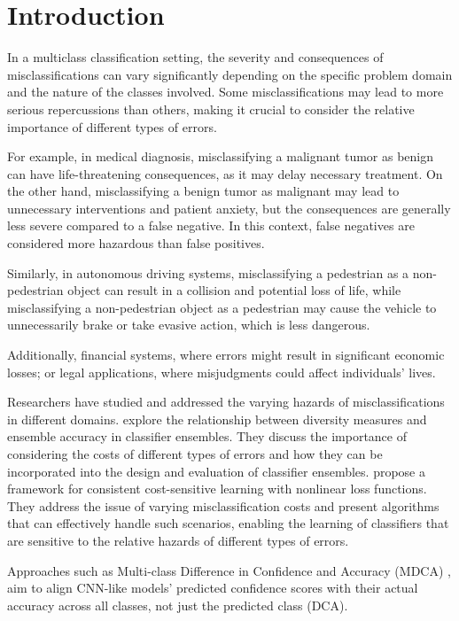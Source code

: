 
\section{Introduction}

In a multiclass classification setting, the severity and consequences of misclassifications can vary significantly depending on the specific problem domain and the nature of the classes involved. Some misclassifications may lead to more serious repercussions than others, making it crucial to consider the relative importance of different types of errors.

For example, in medical diagnosis, misclassifying a malignant tumor as benign can have life-threatening consequences, as it may delay necessary treatment. On the other hand, misclassifying a benign tumor as malignant may lead to unnecessary interventions and patient anxiety, but the consequences are generally less severe compared to a false negative. In this context, false negatives are considered more hazardous than false positives.

Similarly, in autonomous driving systems, misclassifying a pedestrian as a non-pedestrian object can result in a collision and potential loss of life, while misclassifying a non-pedestrian object as a pedestrian may cause the vehicle to unnecessarily brake or take evasive action, which is less dangerous.

Additionally, financial systems, where errors might result in significant economic losses; or legal applications, where misjudgments could affect individuals' lives.

Researchers have studied and addressed the varying hazards of misclassifications in different domains. \cite{kuncheva2006measures} explore the relationship between diversity measures and ensemble accuracy in classifier ensembles. They discuss the importance of considering the costs of different types of errors and how they can be incorporated into the design and evaluation of classifier ensembles.
\cite{mozannar2020consistent} propose a framework for consistent cost-sensitive learning with nonlinear loss functions. They address the issue of varying misclassification costs and present algorithms that can effectively handle such scenarios, enabling the learning of classifiers that are sensitive to the relative hazards of different types of errors.

Approaches such as Multi-class Difference in Confidence and Accuracy (MDCA) \cite{hebbalaguppe2022stitch}, aim to align CNN-like models' predicted confidence scores with their actual accuracy across all classes, not just the predicted class (DCA).

